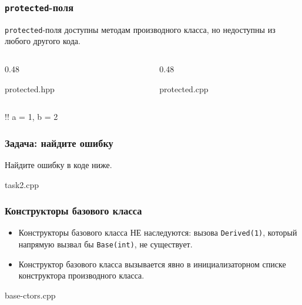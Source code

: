 \documentclass[compress, 8pt, aspectratio=169]{beamer}
\begin{document}
  \begin{frame}[fragile]

    \frametitle{\texttt{protected}-поля}

    \texttt{protected}-поля доступны методам производного класса,
    но недоступны из любого другого кода.

    \begin{columns}[T]

      \begin{column}{0.48\textwidth}

            {protected.hpp}

      \end{column}

      \begin{column}{0.48\textwidth}

            {protected.cpp}

      \end{column}

    \end{columns}

    \begin{terminalwindow}
!!
a = 1, b = 2
    \end{terminalwindow}

  \end{frame}

  \begin{frame}[fragile]

    \frametitle{Задача: найдите ошибку}

    \begin{task}
      Найдите ошибку в коде ниже.
    \end{task}

        {task2.cpp}

  \end{frame}

  \begin{frame}[fragile]

    \frametitle{Конструкторы базового класса}

    \begin{itemize}
      \item Конструкторы базового класса НЕ наследуются: вызова
        \texttt{Derived(1)}, который напрямую вызвал бы
        \texttt{Base(int)}, не существует.
      \item Конструктор базового класса вызывается явно
        \textemdash \space в инициализаторном списке конструктора
        производного класса.
    \end{itemize}

        {base-ctors.cpp}

  \end{frame}
\end{document}
